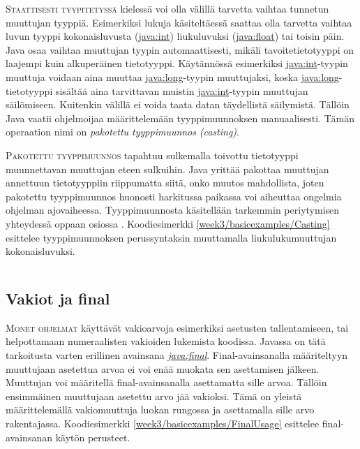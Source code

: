 \documentclass[openany]{book}
\newcommand{\newthought}[1]{\smallskip\textsc{#1}}
\newcommand{\eng}[1]{\textit{(#1)}}
\newcommand{\new}[1]{\textit{\gls{#1}}}
\newcommand{\neweng}[2]{\new{#1} \eng{#2}}
\newcommand{\java}[1]{\underline{\gls{java:#1}}}
\newcommand{\newjava}[1]{\textit{\java{#1}}}
\newcommand{\code}[3]{
	\begin{listing}
		\linespread{0.85}
		\inputminted{java}{OhjelmointiopasEsimerkit/src/#1/#2.java}
		\caption{#1: #3}
		\label{#1/#2}
	\end{listing}
}
\begin{document}
\newthought{Staattisesti tyypitetyssä} kielessä voi olla välillä tarvetta vaihtaa tunnetun
muuttujan tyyppiä. Esimerkiksi lukuja käsiteltäessä saattaa olla tarvetta vaihtaa luvun tyyppi
kokonaisluvusta (\java{int}) liukuluvuksi (\java{float}) tai toisin päin. Java osaa vaihtaa
muuttujan tyypin automaattisesti, mikäli tavoitetietotyyppi on laajempi kuin alkuperäinen
tietotyyppi. Käytännössä esimerkiksi \java{int}-tyypin muuttuja voidaan aina muuttaa
\java{long}-tyypin muuttujaksi, koska \java{long}-tietotyyppi sisältää aina tarvittavan muistin
\java{int}-tyypin muuttujan säilömiseen. Kuitenkin välillä ei voida taata datan täydellistä
säilymistä. Tällöin Java vaatii ohjelmoijaa määrittelemään tyyppimuunnoksen manuaalisesti.
Tämän operaation nimi on \neweng{pakotettu tyyppimuunnos}{casting}.

\newthought{Pakotettu tyyppimuunnos} tapahtuu sulkemalla toivottu tietotyyppi muunnettavan
muuttujan eteen sulkuihin. Java yrittää pakottaa muuttujan annettuun tietotyyppiin riippumatta
siitä, onko muutos mahdollista, joten pakotettu tyyppimuunnos huonosti harkitussa paikassa voi
aiheuttaa ongelmia ohjelman ajovaiheessa. Tyyppimuunnosta käsitellään tarkemmin periytymisen
yhteydessä oppaan osiossa . Koodiesimerkki 
\ref{week3/basicexamples/Casting} esittelee tyyppimuunnoksen perussyntaksin muuttamalla
liukulukumuuttujan kokonaisluvuksi.

\code{week3/basicexamples}{Casting}{Tyyppimuunnos perustietotyypistä toiseen Javassa}

\subsection{Vakiot ja final}
\label{final}

\newthought{Monet ohjelmat} käyttävät vakioarvoja esimerkiksi asetusten tallentamiseen, tai
helpottamaan numeraalisten vakioiden lukemista koodissa. Javassa on tätä tarkoitusta varten
erillinen avainsana \newjava{final}. Final-avainsanalla määriteltyyn muuttujaan asetettua arvoa ei
voi enää muokata sen asettamisen jälkeen. Muuttujan voi määritellä final-avainsanalla asettamatta
sille arvoa. Tällöin ensimmäinen muuttujaan asetettu arvo jää vakioksi. Tämä on yleistä
määrittelemällä vakiomuuttuja luokan rungossa ja asettamalla sille arvo rakentajassa.
Koodiesimerkki \ref{week3/basicexamples/FinalUsage} esittelee final-avainsanan käytön perusteet.

\code{week3/basicexamples}{FinalUsage}{\java{final}-avainsanan käyttö Javassa}
\end{document}

